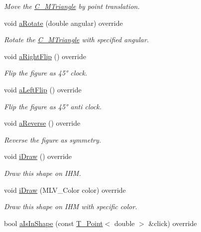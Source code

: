 \begin{DoxyCompactItemize}
\begin{DoxyCompactList}\small\item\em Move the \hyperlink{classC__MTriangle}{C\+\_\+\+M\+Triangle} by point translation. \end{DoxyCompactList}\item 
void \hyperlink{classC__MTriangle_a33aa36879be70b0a11863801da56e92e}{a\+Rotate} (double angular) override
\begin{DoxyCompactList}\small\item\em Rotate the \hyperlink{classC__MTriangle}{C\+\_\+\+M\+Triangle} with specified angular. \end{DoxyCompactList}\item 
void \hyperlink{classC__MTriangle_aa3a1fc0604fa7e13b6c89d242357a163}{a\+Right\+Flip} () override
\begin{DoxyCompactList}\small\item\em Flip the figure as 45° clock. \end{DoxyCompactList}\item 
void \hyperlink{classC__MTriangle_a3dcac8e1341a79139577deb851a6481e}{a\+Left\+Flip} () override
\begin{DoxyCompactList}\small\item\em Flip the figure as 45° anti clock. \end{DoxyCompactList}\item 
void \hyperlink{classC__MTriangle_a44614f4abb94f1a5f963cfb3e8fce7a5}{a\+Reverse} () override
\begin{DoxyCompactList}\small\item\em Reverse the figure as symmetry. \end{DoxyCompactList}\item 
void \hyperlink{classC__MTriangle_ae75dd212f0b580664affc740945c8d0b}{i\+Draw} () override
\begin{DoxyCompactList}\small\item\em Draw this shape on I\+HM. \end{DoxyCompactList}\item 
void \hyperlink{classC__MTriangle_a049e6026145865387db4244678336784}{i\+Draw} (M\+L\+V\+\_\+\+Color color) override
\begin{DoxyCompactList}\small\item\em Draw this shape on I\+HM with specific color. \end{DoxyCompactList}\item 
bool \hyperlink{classC__MTriangle_ae29e4f6608a0079507c6397b3dbef246}{a\+Is\+In\+Shape} (const \hyperlink{classT__Point}{T\+\_\+\+Point}$<$ double $>$ \&click) override

\end{DoxyCompactItemize}
